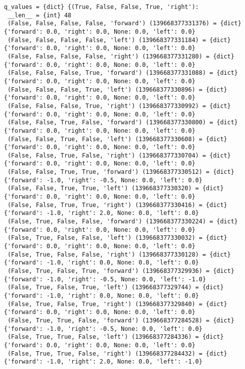 \documentclass[12pt]{article}
\begin{document}
{\tiny
\begin{verbatim}
q_values = {dict} {(True, False, False, True, 'right'): 
 __len__ = {int} 48
 (False, False, False, False, 'forward') (139668377331376) = {dict} {'forward': 0.0, 'right': 0.0, None: 0.0, 'left': 0.0}
 (False, False, False, False, 'left') (139668377331184) = {dict} {'forward': 0.0, 'right': 0.0, None: 0.0, 'left': 0.0}
 (False, False, False, False, 'right') (139668377331280) = {dict} {'forward': 0.0, 'right': 0.0, None: 0.0, 'left': 0.0}
 (False, False, False, True, 'forward') (139668377331088) = {dict} {'forward': 0.0, 'right': 0.0, None: 0.0, 'left': 0.0}
 (False, False, False, True, 'left') (139668377330896) = {dict} {'forward': 0.0, 'right': 0.0, None: 0.0, 'left': 0.0}
 (False, False, False, True, 'right') (139668377330992) = {dict} {'forward': 0.0, 'right': 0.0, None: 0.0, 'left': 0.0}
 (False, False, True, False, 'forward') (139668377330800) = {dict} {'forward': 0.0, 'right': 0.0, None: 0.0, 'left': 0.0}
 (False, False, True, False, 'left') (139668377330608) = {dict} {'forward': 0.0, 'right': 0.0, None: 0.0, 'left': 0.0}
 (False, False, True, False, 'right') (139668377330704) = {dict} {'forward': 0.0, 'right': 0.0, None: 0.0, 'left': 0.0}
 (False, False, True, True, 'forward') (139668377330512) = {dict} {'forward': -1.0, 'right': -0.5, None: 0.0, 'left': 0.0}
 (False, False, True, True, 'left') (139668377330320) = {dict} {'forward': 0.0, 'right': 0.0, None: 0.0, 'left': 0.0}
 (False, False, True, True, 'right') (139668377330416) = {dict} {'forward': -1.0, 'right': 2.0, None: 0.0, 'left': 0.0}
 (False, True, False, False, 'forward') (139668377330224) = {dict} {'forward': 0.0, 'right': 0.0, None: 0.0, 'left': 0.0}
 (False, True, False, False, 'left') (139668377330032) = {dict} {'forward': 0.0, 'right': 0.0, None: 0.0, 'left': 0.0}
 (False, True, False, False, 'right') (139668377330128) = {dict} {'forward': -1.0, 'right': 0.0, None: 0.0, 'left': 0.0}
 (False, True, False, True, 'forward') (139668377329936) = {dict} {'forward': -1.0, 'right': -0.5, None: 0.0, 'left': -1.0}
 (False, True, False, True, 'left') (139668377329744) = {dict} {'forward': -1.0, 'right': 0.0, None: 0.0, 'left': 0.0}
 (False, True, False, True, 'right') (139668377329840) = {dict} {'forward': 0.0, 'right': 0.0, None: 0.0, 'left': 0.0}
 (False, True, True, False, 'forward') (139668377284528) = {dict} {'forward': -1.0, 'right': -0.5, None: 0.0, 'left': 0.0}
 (False, True, True, False, 'left') (139668377284336) = {dict} {'forward': 0.0, 'right': 0.0, None: 0.0, 'left': 0.0}
 (False, True, True, False, 'right') (139668377284432) = {dict} {'forward': -1.0, 'right': 2.0, None: 0.0, 'left': -1.0}

\end{verbatim}}
\end{document}
